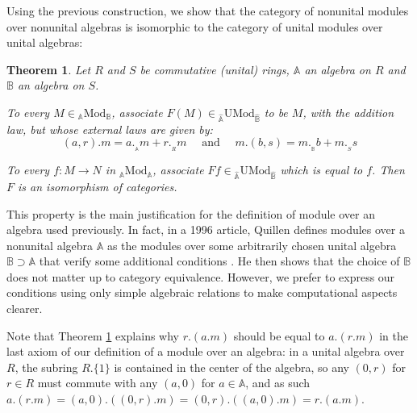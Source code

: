 \documentclass[a4paper,fleqn]{cas-sc}
\newtheorem{thm}{Theorem}%
\newcommand{\bA}{\mathbb{A}}
\newcommand{\bB}{\mathbb{B}}
\newcommand{\md}{\mathrm{UMod}}
\newcommand{\qmod}{\mathrm{Mod}}
\begin{document}
Using the previous construction, we show that the category of nonunital modules over nonunital algebras is isomorphic to the category of unital modules over unital algebras:

\begin{thm}
\label{thm:3}
     Let $R$ and $S$ be commutative (unital) rings, $\bA$ an algebra on $R$ and $\bB$ an algebra on $S$. 

     To every $M \in {}_\bA\qmod_\bB$, associate $F(M) \in {} _{\widehat{\bA}} \md _{\widehat{\bB}}$ to be $M$, with the  addition law, but whose external laws are given by:
    \[
    (a,r).m = a._{_\bA} m + r._{_R} m \quad
    \text{ and } \quad
    m.(b, s) = m._{_\bB} b + m._{_S} s
    \]
    
     To every $f : M \to N$ in $_\bA\qmod_\bA$, associate $Ff \in {} _{\widehat{\bA}} \md _{\widehat{\bB}}$ which is equal to $f$. 
     Then $F$ is an isomorphism of categories.
\end{thm}

This property is the main justification for the definition of module over an algebra used previously. In fact, in a 1996 article, Quillen defines modules over a nonunital algebra $\bA$ as the modules over some arbitrarily chosen unital algebra $\bB \supset \bA$ that verify some additional conditions \cite{quillen}. He then shows that the choice of $\bB$ does not matter up to category equivalence. However, we prefer to express our conditions using only simple algebraic relations to make computational aspects clearer.

Note that Theorem \ref{thm:3} explains why $r.(a.m)$ should be equal to $a.(r.m)$ in the last axiom of our definition of a module over an algebra: in a unital algebra over $R$, the subring $R.\{1\}$ is contained in the center of the algebra, so any $(0,r)$ for $r \in R$ must commute with any $(a, 0)$ for $a \in \bA$, and as such $a.(r.m) = (a,0).((0,r).m) = (0,r).((a,0).m) = r.(a.m)$.
\end{document}
